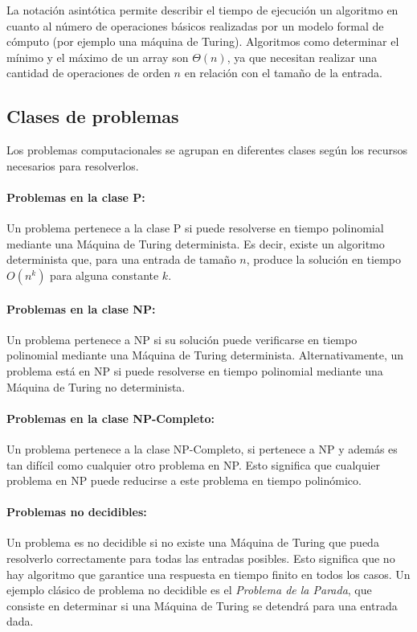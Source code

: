 \documentclass{article}
\begin{document}
La notación asintótica permite describir el tiempo de ejecución un algoritmo en cuanto al número de operaciones básicos realizadas
por un modelo formal de cómputo (por ejemplo una máquina de Turing). Algoritmos como determinar el mínimo y el máximo de
un array son $\Theta(n)$, ya que necesitan realizar una cantidad de operaciones de orden $n$ en relación con el tamaño de la entrada.

\subsection{Clases de problemas}

Los problemas computacionales \cite{authomataTheory} se agrupan en diferentes clases según los recursos necesarios para resolverlos.

\paragraph{Problemas en la clase P:}
Un problema pertenece a la clase P si puede resolverse en tiempo polinomial mediante una Máquina de Turing determinista. Es decir, existe un algoritmo determinista que, para una entrada de tamaño $n$, produce la solución en tiempo $O(n^k)$ para alguna constante $k$.

\paragraph{Problemas en la clase NP:}
Un problema pertenece a NP si su solución puede verificarse en tiempo polinomial mediante una Máquina de Turing determinista. Alternativamente, un problema está en NP si puede resolverse en tiempo polinomial mediante una Máquina de Turing no determinista.

\paragraph{Problemas en la clase NP-Completo:}
Un problema pertenece a la clase NP-Completo, si pertenece a NP y además es tan difícil como cualquier otro problema en NP. Esto significa que cualquier problema en NP puede reducirse a este problema en tiempo polinómico.

\paragraph{Problemas no decidibles:}
Un problema es no decidible si no existe una Máquina de Turing que pueda resolverlo correctamente para todas las entradas posibles. Esto significa que no hay algoritmo que garantice una respuesta en tiempo finito en todos los casos. Un ejemplo clásico de problema no decidible es el \textit{Problema de la Parada}, que consiste en determinar si una Máquina de Turing se detendrá para una entrada dada.
\end{document}
